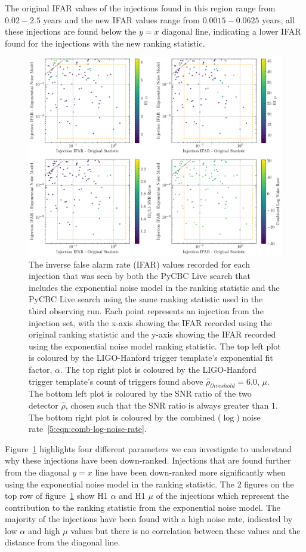 %
The original IFAR values of the injections found in this region range from $0.02 - 2.5$ years and the new IFAR values range from $0.0015 - 0.0625$ years, all these injections are found below the $y = x$ diagonal line, indicating a lower IFAR found for the injections with the new ranking statistic. 
%
\begin{figure}
    \centering
    \includegraphics[width=1\textwidth]{images/5_pycbclive/regions/fits_only_ifar_vs_ifar_bottom_left_region_subplots.pdf}
    \caption{The inverse false alarm rate (IFAR) values recorded for each injection that was seen by both the PyCBC Live search that includes the exponential noise model in the ranking statistic and the PyCBC Live search using the same ranking statistic used in the third observing run. Each point represents an injection from the injection set, with the x-axis showing the IFAR recorded using the original ranking statistic and the y-axis showing the IFAR recorded using the exponential noise model ranking statistic. The top left plot is coloured by the LIGO-Hanford trigger template's exponential fit factor, $\alpha$. The top right plot is coloured by the LIGO-Hanford trigger template's count of triggers found above $\hat{\rho}_{threshold} = 6.0$, $\mu$. The bottom left plot is coloured by the SNR ratio of the two detector $\hat{\rho}$, chosen such that the SNR ratio is always greater than $1$. The bottom right plot is coloured by the combined ($\log$) noise rate~\ref{5:eqn:comb-log-noise-rate}.}
    \label{5:fig:bottom-left-subplots}
\end{figure}
%
Figure~\ref{5:fig:bottom-left-subplots} highlights four different parameters we can investigate to understand why these injections have been down-ranked. Injections that are found further from the diagonal $y = x$ line have been down-ranked more significantly when using the exponential noise model in the ranking statistic. The 2 figures on the top row of figure~\ref{5:fig:bottom-left-subplots} show H1 $\alpha$ and H1 $\mu$ of the injections which represent the contribution to the ranking statistic from the exponential noise model. The majority of the injections have been found with a high noise rate, indicated by low $\alpha$ and high $\mu$ values but there is no correlation between these values and the distance from the diagonal line.

